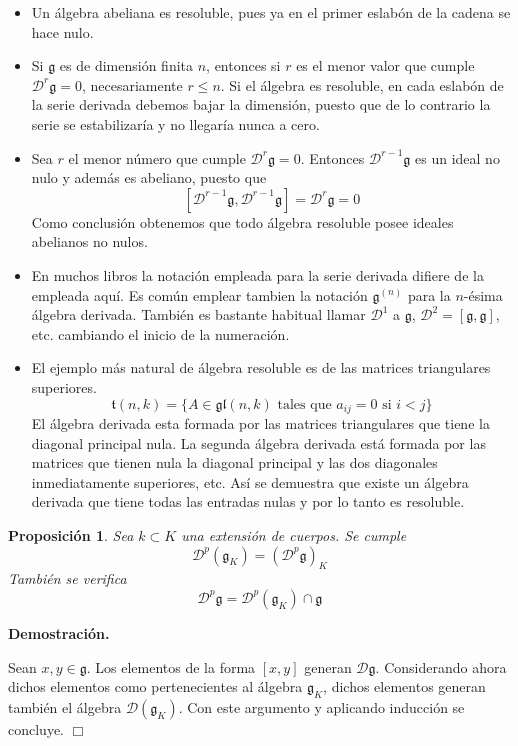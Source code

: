 \documentclass[a4paper,draft,12pt]{article}
\newtheorem{propo}[teo]{Proposición}%
\newcommand{\dem}{\noindent \textbf{Demostración. }\vspace{0.3 cm}}%
\newcommand{\g}{\mathfrak{g}}%
\newcommand{\fin}{ $\Box $ \vspace{0.4 cm}}
\newcommand{\D}{\mathcal{D}}%
\begin{document}
\begin{itemize}


\item Un álgebra abeliana es resoluble, pues ya en el primer eslabón de la cadena se hace nulo.

\item Si $\g$ es de dimensión finita $n$, entonces si $r$ es el menor valor que cumple $\D^r\g=0$, necesariamente $r\leq n$. Si el álgebra es resoluble,  en cada eslabón de la serie derivada debemos bajar la dimensión, puesto que de lo contrario la serie se estabilizaría y no llegaría nunca a cero.

\item Sea $r$ el menor número que cumple $\D^r\g=0$.  Entonces $\D^{r-1}\g$ es un ideal no nulo y además es abeliano, puesto que 
$$
[\D^{r-1}\g,\D^{r-1}\g] = \D^r\g =0
$$
Como conclusión obtenemos que todo álgebra resoluble posee ideales abelianos no nulos.



\item  En muchos libros la notación empleada para la serie derivada difiere de la empleada aquí.  Es común emplear tambien la notación $\g^{(n)}$ para la $n$-ésima álgebra derivada. También es bastante habitual llamar $\D^1$ a $\g$, $\D^2 =[\g,\g]$, etc. cambiando el inicio de la numeración.  

\item El ejemplo más natural de álgebra resoluble es de las matrices triangulares superiores. 
$$
\mathfrak{t}(n,k)= \{ A \in \mathfrak{gl}(n,k) \text{ tales que } a_{ij}=0 \text{ si } i<j\}
$$ 
El álgebra derivada esta formada por las matrices triangulares que tiene la diagonal principal nula.  La segunda álgebra derivada está formada por las matrices que tienen nula la diagonal principal y las dos diagonales inmediatamente superiores, etc.  Así  se demuestra que existe un álgebra derivada que tiene todas las entradas nulas y por lo tanto es resoluble.


\end{itemize}

\begin{propo}

Sea $k \subset K$ una extensión de cuerpos. Se cumple
$$
\D^p(\g_K)= (\D^p\g)_K
$$
También se verifica
$$
\D^p\g= \D^p(\g_K) \cap \g
$$

\end{propo}


\dem

Sean $x,y \in \g$. Los elementos de la forma $[x,y]$ generan $\D\g$.  Considerando ahora dichos elementos como pertenecientes al álgebra $\g_K$, dichos elementos generan también el álgebra $\D(\g_K)$.  Con este argumento y aplicando inducción se concluye. \fin
\end{document}
